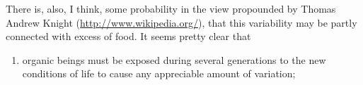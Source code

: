 There is, also, I think, some probability in the view propounded by Thomas Andrew Knight (\href{Wikipedia}{http://www.wikipedia.org/}), that this variability may be partly connected with excess of food. It seems pretty clear that

\begin{enumerate}
\item organic beings must be exposed during several generations to the new conditions of life to cause any appreciable amount of variation;
\end{enumerate}
